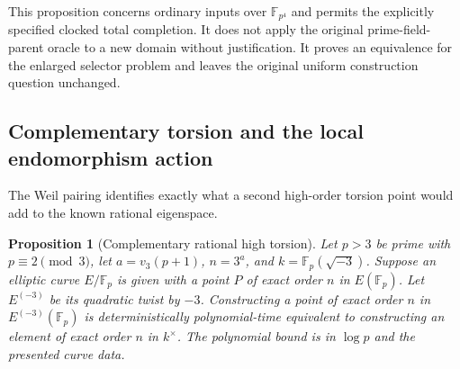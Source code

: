 \documentclass[11pt]{article}
\newtheorem{proposition}[theorem]{Proposition}
\theoremstyle{definition}
\theoremstyle{remark}
\begin{document}
This proposition concerns ordinary inputs over $\mathbb F_{p^4}$
and permits the explicitly specified clocked total completion.
It does not apply the original prime-field-parent oracle to a
new domain without justification.  It proves an equivalence
for the enlarged selector problem and leaves the original
uniform construction question unchanged.

\subsection{Complementary torsion and the local endomorphism action}
The Weil pairing identifies exactly what a second high-order torsion
point would add to the known rational eigenspace.


\begin{proposition}[Complementary rational high torsion]
\label{prop:complementary-torsion-gate}
Let $p>3$ be prime with $p\equiv2\pmod3$, let
$a=v_3(p+1)$, $n=3^a$, and
$k=\mathbb F_p(\sqrt{-3})$.
Suppose an elliptic curve $E/\mathbb F_p$ is given with a
point $P$ of exact order $n$ in $E(\mathbb F_p)$.
Let $E^{(-3)}$ be its quadratic twist by $-3$.
Constructing a point of exact order $n$ in
$E^{(-3)}(\mathbb F_p)$ is deterministically polynomial-time
equivalent to constructing an element of exact order $n$ in
$k^\times$.  The polynomial bound is in $\log p$ and the
presented curve data.
\end{proposition}
\end{document}
